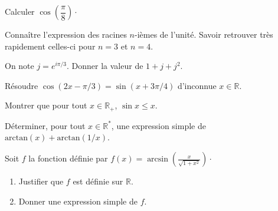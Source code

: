 \documentclass[a4paper,twoside,french,10pt]{VcCours}
\begin{document}
\medskip 

\begin{Exercice}{}\end{Exercice} Calculer $\cos \left(\dfrac{\pi}{8}\right) \cdot$

\medskip

\begin{ptc}{}
	Connaître l'expression des racines $n$-ièmes de l'unité. Savoir retrouver très rapidement celles-ci pour $n=3$ et $n=4$.
\end{ptc}

\begin{Exercice}{}\end{Exercice} On note $j=e^{i \pi/3}$. Donner la valeur de $1+j+j^2$.


\medskip

\begin{Exercice}{}\end{Exercice} Résoudre $\cos(2x - \pi / 3) = \sin(x + {3\pi} / 4)$ d'inconnue $x \in \mathbb{R}$.

\medskip

\begin{Exercice}{}\end{Exercice} Montrer que pour tout $x \in \mathbb{R}_+$, $\sin x \leq x$.

%

\medskip

\begin{Exercice}{}\end{Exercice} Déterminer, pour tout $x \in \mathbb{R}^*$, une expression simple de $\textrm{arctan}(x)+ \textrm{arctan}(1/x)$.

\medskip

\vspace{-0.1cm}
\begin{Exercice}{}\end{Exercice} Soit $f$ la fonction définie par $f(x) =  \arcsin \left( \frac{x}{\sqrt {1 + x^{2}}} \right) \cdot$

\begin{enumerate}
\item Justifier que $f$ est définie sur $\mathbb{R}$.
\item Donner une expression simple de $f$.
\end{enumerate}
\end{document}
